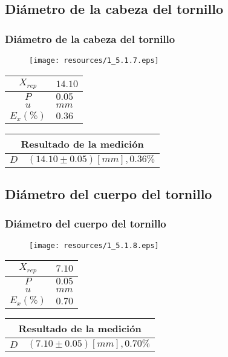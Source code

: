 \documentclass[letter,11pt]{beamer}
\begin{document}
\subsection{Diámetro de la cabeza del tornillo}
\begin{frame}
\frametitle{Diámetro de la cabeza del tornillo}
\vspace*{0.8cm}
\begin{figure}
\centering
\texttt{[image: resources/1\_5.1.7.eps]}
\end{figure}
\vspace*{0.4cm}
\scriptsize
\begin{tabular}{|c|>{\centering}m{1.8cm}<{\centering}|}
\hline
$X_{rep}$ &  $14.10$ \tabularnewline \hline
      $P$ &   $0.05$ \tabularnewline \hline
      $u$ &     $mm$ \tabularnewline \hline
$E_x(\%)$ &   $0.36$ \tabularnewline \hline
\end{tabular}
\quad
\begin{tabular}{|c|>{\centering}m{5.7cm}<{\centering}|}
\hline
\multicolumn{2}{|c|}{\textbf{Resultado de la medición}} \\ \hline
$D$ & $( 14.10\pm0.05)[mm], 0.36\%$ \tabularnewline \hline
\end{tabular}
\end{frame}

\subsection{Diámetro del cuerpo del tornillo}
\begin{frame}
\frametitle{Diámetro del cuerpo del tornillo}
\vspace*{0.8cm}
\begin{figure}
\centering
\texttt{[image: resources/1\_5.1.8.eps]}
\end{figure}
\vspace*{0.4cm}
\scriptsize
\begin{tabular}{|c|>{\centering}m{1.8cm}<{\centering}|}
\hline
$X_{rep}$ &   $7.10$ \tabularnewline \hline
      $P$ &   $0.05$ \tabularnewline \hline
      $u$ &     $mm$ \tabularnewline \hline
$E_x(\%)$ &   $0.70$ \tabularnewline \hline
\end{tabular}
\quad
\begin{tabular}{|c|>{\centering}m{5.7cm}<{\centering}|}
\hline
\multicolumn{2}{|c|}{\textbf{Resultado de la medición}} \\ \hline
$D$ & $(  7.10\pm0.05)[mm], 0.70\%$ \tabularnewline \hline
\end{tabular}
\end{frame}
\end{document}
